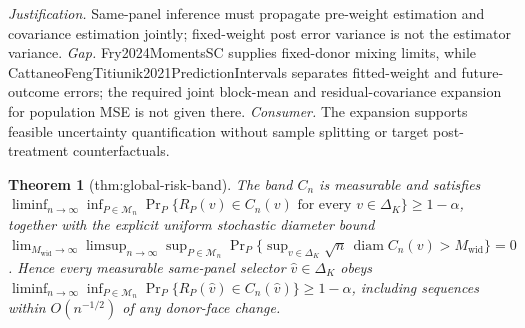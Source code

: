 \documentclass{article}
\newtheorem{theorem}{Theorem}
\begin{document}
\par\smallskip\noindent \textit{Justification.} Same-panel inference must propagate pre-weight estimation and covariance estimation jointly; fixed-weight post error variance is not the estimator variance. \textit{Gap.} Fry2024MomentsSC supplies fixed-donor mixing limits, while CattaneoFengTitiunik2021PredictionIntervals separates fitted-weight and future-outcome errors; the required joint block-mean and residual-covariance expansion for population MSE is not given there. \textit{Consumer.} The expansion supports feasible uncertainty quantification without sample splitting or target post-treatment counterfactuals.

\begin{theorem}[thm:global-risk-band]\label{thm:global-risk-band}
The band \(C_n\) is measurable and satisfies \(\liminf_{n\to\infty}\inf_{P\in\mathcal M_n}\Pr_P\{R_P(v)\in C_n(v)\text{ for every }v\in\Delta_K\}\ge1-\alpha\), together with the explicit uniform stochastic diameter bound \(\lim_{M_{\mathrm{wid}}\to\infty}\limsup_{n\to\infty}\sup_{P\in\mathcal M_n}\Pr_P\{\sup_{v\in\Delta_K}\sqrt n\,\operatorname{diam}C_n(v)>M_{\mathrm{wid}}\}=0\). Hence every measurable same-panel selector \(\widehat v\in\Delta_K\) obeys \(\liminf_{n\to\infty}\inf_{P\in\mathcal M_n}\Pr_P\{R_P(\widehat v)\in C_n(\widehat v)\}\ge1-\alpha\), including sequences within \(O(n^{-1/2})\) of any donor-face change.
\end{theorem}
\end{document}
